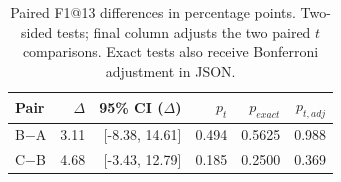 \begin{table}[htbp]\centering\small
\caption{Paired F1@13 differences in percentage points. Two-sided tests; final column adjusts the two paired $t$ comparisons. Exact tests also receive Bonferroni adjustment in JSON.}\label{tab:significance}
\begin{tabular}{@{}lrrrrr@{}}\toprule
Pair & $\Delta$ & 95\% CI ($\Delta$) & $p_t$ & $p_{exact}$ & $p_{t,adj}$\\\midrule
B$-$A & 3.11 & [-8.38, 14.61] & 0.494 & 0.5625 & 0.988\\
C$-$B & 4.68 & [-3.43, 12.79] & 0.185 & 0.2500 & 0.369\\
\bottomrule\end{tabular}\end{table}

